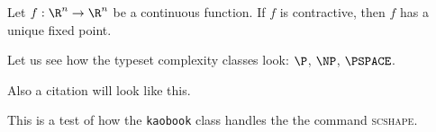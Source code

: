 \begin{theorem}
    \label{thm:fixed_point}
    Let $f: \R^n \to \R^n$ be a continuous function. If $f$ is
    contractive, then $f$ has a unique fixed point.
\end{theorem}
Let us see how the typeset complexity classes look: $\P$, $\NP$, $\PSPACE$.

Also a citation
 will look like this.

This is a test of how the \texttt{kaobook} class handles the the command
\textsc{scshape}.
